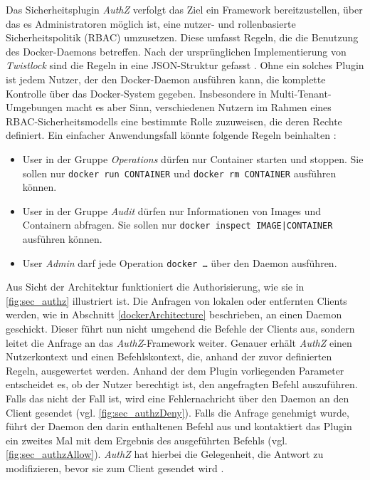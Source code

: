 \documentclass[../main.tex]{subfiles}
\begin{document}
    Das Sicherheitsplugin \emph{AuthZ} verfolgt das Ziel ein Framework bereitzustellen, über das es Administratoren möglich ist, eine nutzer- und rollenbasierte Sicherheitspolitik (\acrshort{RBAC}) umzusetzen. Diese umfasst Regeln, die die Benutzung des Docker-Daemons betreffen. Nach der ursprünglichen Implementierung von \emph{Twistlock} sind die Regeln in eine JSON-Struktur gefasst \cite{githubAuthZJSON}. Ohne ein solches Plugin ist jedem Nutzer, der den Docker-Daemon ausführen kann, die komplette Kontrolle über das Docker-System gegeben. Insbesondere in Multi-Tenant-Umgebungen macht es aber Sinn, verschiedenen Nutzern im Rahmen eines RBAC-Sicherheitsmodells eine bestimmte Rolle zuzuweisen, die deren Rechte definiert. Ein einfacher Anwendungsfall könnte folgende Regeln beinhalten \cite{authzTwistlock}:

    \begin{itemize}
        \item User in der Gruppe \emph{Operations} dürfen nur Container starten und stoppen. Sie sollen nur \texttt{docker run CONTAINER} und \texttt{docker rm CONTAINER} ausführen können.
        \item User in der Gruppe \emph{Audit} dürfen nur Informationen von Images und Containern abfragen. Sie sollen nur \texttt{docker inspect IMAGE|CONTAINER} ausführen können.
        \item User \emph{Admin} darf jede Operation \texttt{docker \dots} über den Daemon ausführen.
    \end{itemize}

    Aus Sicht der Architektur funktioniert die Authorisierung, wie sie in \fig \ref{fig:sec_authz} illustriert ist. Die Anfragen von lokalen oder entfernten Clients werden, wie in Abschnitt \ref{dockerArchitecture} beschrieben, an einen Daemon geschickt. Dieser führt nun nicht umgehend die Befehle der Clients aus, sondern leitet die Anfrage an das \emph{AuthZ}-Framework weiter. Genauer erhält \emph{AuthZ} einen Nutzerkontext und einen Befehlskontext, die, anhand der zuvor definierten Regeln, ausgewertet werden. Anhand der dem Plugin vorliegenden Parameter entscheidet es, ob der Nutzer berechtigt ist, den angefragten Befehl auszuführen. Falls das nicht der Fall ist, wird eine Fehlernachricht über den Daemon an den Client gesendet (vgl. \fig \ref{fig:sec_authzDeny}). Falls die Anfrage genehmigt wurde, führt der Daemon den darin enthaltenen Befehl aus und kontaktiert das Plugin ein zweites Mal mit dem Ergebnis des ausgeführten Befehls (vgl. \fig \ref{fig:sec_authzAllow}). \emph{AuthZ} hat hierbei die Gelegenheit, die Antwort zu modifizieren, bevor sie zum Client gesendet wird \cite{authzTwistlock}\cite{githubAuthZDraft}.
\end{document}
